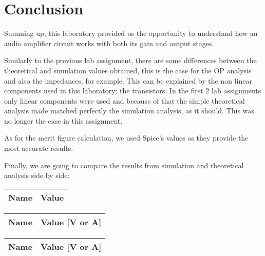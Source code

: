 \section{Conclusion}
\label{sec:conclusion}

Summing up, this laboratory provided us the opportunity to understand how an audio amplifier circuit works with both its gain and output stages.\par
Similarly to the previous lab assignment, there are some differences between the theoretical and simulation values obtained, this is the case for the OP analysis and also the impedances, for example. This can be explained by the non linear components used in this laboratory: the transistors. In the first 2 lab assignments only linear components were used and because of that the simple theoretical analysis made matched perfectly the simulation analysis, as it should. This was no longer the case in this assignment. \par
As for the merit figure calculation, we used Spice's values as they provide the most accurate results. \par
Finally, we are going to compare the results from simulation and theoretical analysis side by side: \par

\begin{center}
  \begin{tabular}{ | c | c | }
    \hline    
    {\bf Name} & {\bf Value} \\ \hline
    
  \end{tabular}
\end{center}

\begin{center}
  \begin{tabular}{ | c | c | }
    \hline    
    {\bf Name} & {\bf Value [V or A]} \\ \hline
    
    \hline
  \end{tabular}
\end{center}

\begin{center}
  \begin{tabular}{ | c | c | }
    \hline    
    {\bf Name} & {\bf Value [V or A]} \\ \hline
    
    \hline
  \end{tabular}
\end{center}

